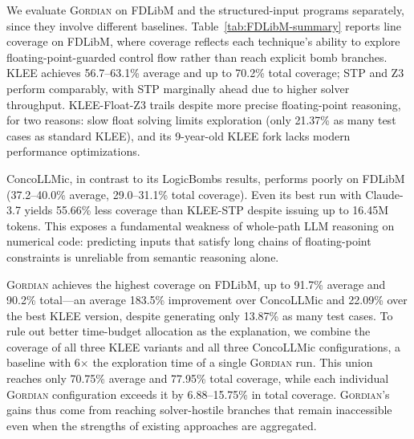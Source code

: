\documentclass[acmsmall]{acmart}
\newcommand{\projName}{\textsc{Gordian}\xspace}
\theoremstyle{definition}
\begin{document}
We evaluate \projName{} on FDLibM and the structured-input programs separately, since they involve different baselines.
Table~\ref{tab:FDLibM-summary} reports line coverage on FDLibM, where coverage reflects each technique's ability to explore floating-point-guarded control flow rather than reach explicit bomb branches. KLEE achieves 56.7--63.1\% average and up to 70.2\% total coverage; STP and Z3 perform comparably, with STP marginally ahead due to higher solver throughput. KLEE-Float-Z3 trails despite more precise floating-point reasoning, for two reasons: slow float solving limits exploration (only 21.37\% as many test cases as standard KLEE), and its 9-year-old KLEE fork lacks modern performance optimizations.

ConcoLLMic, in contrast to its LogicBombs results, performs poorly on FDLibM (37.2--40.0\% average, 29.0--31.1\% total coverage). Even its best run with Claude-3.7 yields 55.66\% less coverage than KLEE-STP despite issuing up to 16.45M tokens. This exposes a fundamental weakness of whole-path LLM reasoning on numerical code: predicting inputs that satisfy long chains of floating-point constraints is unreliable from semantic reasoning alone.

\projName{} achieves the highest coverage on FDLibM, up to 91.7\% average and 90.2\% total---an average 183.5\% improvement over ConcoLLMic and 22.09\% over the best KLEE version, despite generating only 13.87\% as many test cases. To rule out better time-budget allocation as the explanation, we combine the coverage of all three KLEE variants and all three ConcoLLMic configurations, a baseline with 6$\times$ the exploration time of a single \projName{} run. This union reaches only 70.75\% average and 77.95\% total coverage, while each individual \projName{} configuration exceeds it by 6.88--15.75\% in total coverage. \projName{}'s gains thus come from reaching solver-hostile branches that remain inaccessible even when the strengths of existing approaches are aggregated.

\end{document}
